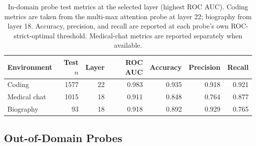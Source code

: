 \documentclass{article}
\begin{document}
\begin{table}[h]
\centering
\begin{tabular}{lrrrrrr}
\toprule
\textbf{Environment} & \textbf{Test $n$} & \textbf{Layer} & \textbf{ROC AUC} & \textbf{Accuracy} & \textbf{Precision} & \textbf{Recall} \\
\midrule
Coding         & 1577 & 22 & 0.983 & 0.935 & 0.918 & 0.921 \\
  Medical chat   & 1015 & 18 & 0.911 & 0.848 & 0.764 & 0.877 \\
  Biography      & 93   & 18 & 0.918 & 0.892 & 0.929 & 0.765 \\
\bottomrule
\end{tabular}
\vspace{0.5em}
\caption{In-domain probe test metrics at the selected layer (highest ROC AUC). Coding metrics are taken from the multi-max attention probe at layer 22; biography from layer 18. Accuracy, precision, and recall are reported at each probe's own ROC-strict-optimal threshold. Medical-chat metrics are reported separately when available.}
\label{tab:probe_indomain}
\end{table}


\subsection{Out-of-Domain Probes}
\label{app:probetraining_ood}
\end{document}
